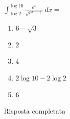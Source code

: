 \begin{quiz}
$\displaystyle\int_{\log2}^{\log10}\frac{e^x}{\sqrt{e^x-1}}\,dx=$
\begin{enumerate}
\item $6-\sqrt3$
\item $2$
\item $4$
\item $2\log10-2\log2$
\item $6$
\end{enumerate}
\end{quiz}
Risposta completata
